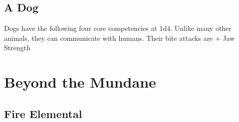 \subsection{A Dog}
\label{subsec:dog}
Dogs have the following four core competencies at 1d4.
Unlike many other animals, they can communicate with humans.
Their bite attacks are  + Jaw Strength\\


\section{Beyond the Mundane}

\subsection{Fire Elemental}
\label{subsec:fire_elemental}
